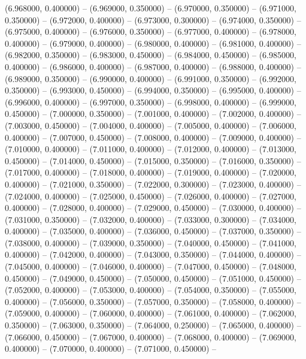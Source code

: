 (6.968000, 0.400000) -- 
(6.969000, 0.350000) -- 
(6.970000, 0.350000) -- 
(6.971000, 0.350000) -- 
(6.972000, 0.400000) -- 
(6.973000, 0.300000) -- 
(6.974000, 0.350000) -- 
(6.975000, 0.400000) -- 
(6.976000, 0.350000) -- 
(6.977000, 0.400000) -- 
(6.978000, 0.400000) -- 
(6.979000, 0.400000) -- 
(6.980000, 0.400000) -- 
(6.981000, 0.400000) -- 
(6.982000, 0.350000) -- 
(6.983000, 0.450000) -- 
(6.984000, 0.450000) -- 
(6.985000, 0.400000) -- 
(6.986000, 0.400000) -- 
(6.987000, 0.400000) -- 
(6.988000, 0.400000) -- 
(6.989000, 0.350000) -- 
(6.990000, 0.400000) -- 
(6.991000, 0.350000) -- 
(6.992000, 0.350000) -- 
(6.993000, 0.450000) -- 
(6.994000, 0.350000) -- 
(6.995000, 0.400000) -- 
(6.996000, 0.400000) -- 
(6.997000, 0.350000) -- 
(6.998000, 0.400000) -- 
(6.999000, 0.450000) -- 
(7.000000, 0.350000) -- 
(7.001000, 0.400000) -- 
(7.002000, 0.400000) -- 
(7.003000, 0.450000) -- 
(7.004000, 0.400000) -- 
(7.005000, 0.400000) -- 
(7.006000, 0.400000) -- 
(7.007000, 0.450000) -- 
(7.008000, 0.400000) -- 
(7.009000, 0.400000) -- 
(7.010000, 0.400000) -- 
(7.011000, 0.400000) -- 
(7.012000, 0.400000) -- 
(7.013000, 0.450000) -- 
(7.014000, 0.450000) -- 
(7.015000, 0.350000) -- 
(7.016000, 0.350000) -- 
(7.017000, 0.400000) -- 
(7.018000, 0.400000) -- 
(7.019000, 0.400000) -- 
(7.020000, 0.400000) -- 
(7.021000, 0.350000) -- 
(7.022000, 0.300000) -- 
(7.023000, 0.400000) -- 
(7.024000, 0.400000) -- 
(7.025000, 0.450000) -- 
(7.026000, 0.400000) -- 
(7.027000, 0.400000) -- 
(7.028000, 0.400000) -- 
(7.029000, 0.450000) -- 
(7.030000, 0.400000) -- 
(7.031000, 0.350000) -- 
(7.032000, 0.400000) -- 
(7.033000, 0.300000) -- 
(7.034000, 0.400000) -- 
(7.035000, 0.400000) -- 
(7.036000, 0.450000) -- 
(7.037000, 0.350000) -- 
(7.038000, 0.400000) -- 
(7.039000, 0.350000) -- 
(7.040000, 0.450000) -- 
(7.041000, 0.400000) -- 
(7.042000, 0.400000) -- 
(7.043000, 0.350000) -- 
(7.044000, 0.400000) -- 
(7.045000, 0.400000) -- 
(7.046000, 0.400000) -- 
(7.047000, 0.450000) -- 
(7.048000, 0.450000) -- 
(7.049000, 0.450000) -- 
(7.050000, 0.450000) -- 
(7.051000, 0.450000) -- 
(7.052000, 0.400000) -- 
(7.053000, 0.400000) -- 
(7.054000, 0.350000) -- 
(7.055000, 0.400000) -- 
(7.056000, 0.350000) -- 
(7.057000, 0.350000) -- 
(7.058000, 0.400000) -- 
(7.059000, 0.400000) -- 
(7.060000, 0.400000) -- 
(7.061000, 0.400000) -- 
(7.062000, 0.350000) -- 
(7.063000, 0.350000) -- 
(7.064000, 0.250000) -- 
(7.065000, 0.400000) -- 
(7.066000, 0.450000) -- 
(7.067000, 0.400000) -- 
(7.068000, 0.400000) -- 
(7.069000, 0.400000) -- 
(7.070000, 0.400000) -- 
(7.071000, 0.450000) -- 
